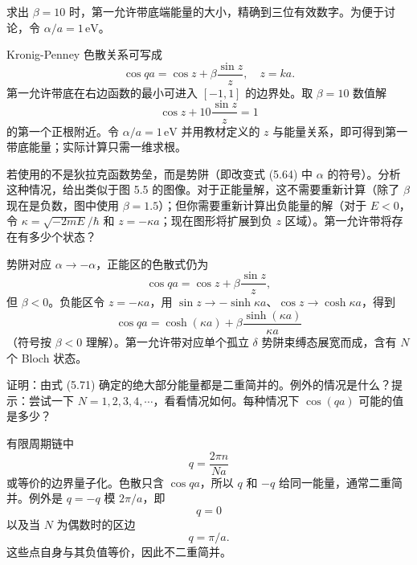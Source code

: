 \begin{question}
求出 $\beta=10$ 时，第一允许带底端能量的大小，精确到三位有效数字。为便于讨论，令 $\alpha/a=1\,\mathrm{eV}$。
\end{question}
\begin{solution}

Kronig-Penney 色散关系可写成
\[
\cos qa=\cos z+\beta\frac{\sin z}{z},
\quad z=ka.
\]
第一允许带底在右边函数的最小可进入 $[-1,1]$ 的边界处。取 $\beta=10$ 数值解
\[
\cos z+10\frac{\sin z}{z}=1
\]
的第一个正根附近。令 $\alpha/a=1\,\mathrm{eV}$ 并用教材定义的 $z$ 与能量关系，即可得到第一带底能量；实际计算只需一维求根。

\end{solution}

\begin{question}
若使用的不是狄拉克函数势垒，而是势阱（即改变式 (5.64) 中 $\alpha$ 的符号）。分析这种情况，给出类似于图 5.5 的图像。对于正能量解，这不需要重新计算（除了 $\beta$ 现在是负数，图中使用 $\beta=1.5$）；但你需要重新计算出负能量的解（对于 $E<0$，令 $\kappa=\sqrt{-2mE}/\hbar$ 和 $z=-\kappa a$；现在图形将扩展到负 $z$ 区域）。第一允许带将存在有多少个状态？

\par\smallskip
{}

\end{question}
\begin{solution}

势阱对应 $\alpha\to-\alpha$，正能区的色散式仍为
\[
\cos qa=\cos z+\beta\frac{\sin z}{z},
\]
但 $\beta<0$。负能区令 $z=-\kappa a$，用 $\sin z\to-\sinh\kappa a$、$\cos z\to\cosh\kappa a$，得到
\[
\cos qa=\cosh(\kappa a)+\beta\frac{\sinh(\kappa a)}{\kappa a}
\]
（符号按 $\beta<0$ 理解）。第一允许带对应单个孤立 $\delta$ 势阱束缚态展宽而成，含有 $N$ 个 Bloch 状态。

\end{solution}

\begin{question}
证明：由式 (5.71) 确定的绝大部分能量都是二重简并的。例外的情况是什么？提示：尝试一下 $N=1,2,3,4,\cdots$，看看情况如何。每种情况下 $\cos(qa)$ 可能的值是多少？

\par\smallskip
{}

\end{question}
\begin{solution}

有限周期链中
\[
q=\frac{2\pi n}{Na}
\]
或等价的边界量子化。色散只含 $\cos qa$，所以 $q$ 和 $-q$ 给同一能量，通常二重简并。例外是 $q=-q$ 模 $2\pi/a$，即
\[
q=0
\]
以及当 $N$ 为偶数时的区边
\[
q=\pi/a.
\]
这些点自身与其负值等价，因此不二重简并。

\end{solution}

